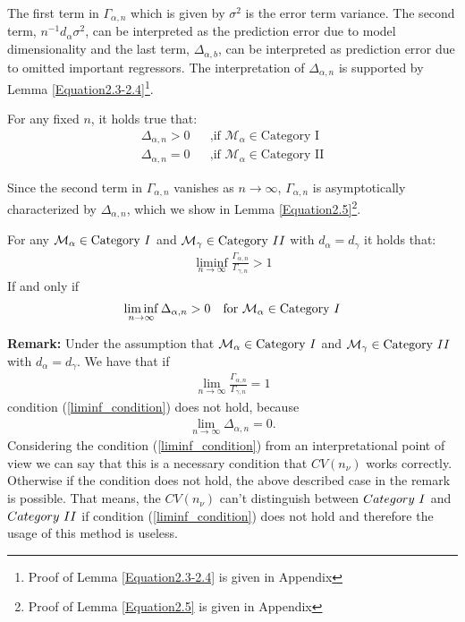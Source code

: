 \documentclass[Research_Module_ES.tex]{subfiles}
\begin{document}
 The first term in $\Gamma_{\alpha,n}$ which is given by $\sigma^2$ is the error term variance. The second term, $n^{-1}d_\alpha\sigma^2$, can be interpreted as the prediction error due to model dimensionality and the last term, $\Delta_{\alpha,b}$, can be interpreted as prediction error due to omitted important regressors. The interpretation of $\Delta_{\alpha,n}$ is supported by Lemma \ref{Equation2.3-2.4}\footnote{Proof of Lemma \ref{Equation2.3-2.4} is given in Appendix }.
\begin{lemma}
	\label{Equation2.3-2.4}
	For any fixed $n$, it holds true that:
	\begin{align*}
		&&\Delta_{\alpha,n}>0 &&\text{,if } \mathcal{M}_\alpha\in\text{Category I}&&\\
		&&\Delta_{\alpha,n}=0 &&\text{,if } \mathcal{M}_\alpha\in\text{Category II}&&
	\end{align*}
\end{lemma}
Since the second term in $\Gamma_{\alpha,n}$ vanishes as $n\to\infty$, $\Gamma_{\alpha,n}$ is asymptotically characterized by $\Delta_{\alpha,n}$, which we show in Lemma \ref{Equation2.5}\footnote{Proof of Lemma \ref{Equation2.5} is given in Appendix }. 
\begin{lemma}
	\label{Equation2.5}
	For any $\mathcal{M}_\alpha\in\text{Category}~\RM{1}$ and $\mathcal{M}_\gamma\in\text{Category}~\RM{2}$ with $d_\alpha=d_\gamma$ it holds that:
	\begin{align*}
	\liminf_{n\rightarrow\infty}\frac{\Gamma_{\alpha,n}}{\Gamma_{\gamma,n}}>1
	\end{align*}
	If and only if
	\begin{align}
	\liminf_{n\rightarrow\infty}\Delta_{\alpha,n}>0 \text{~~~for~}\mathcal{M}_\alpha\in\text{Category}~\RM{1} \label{liminf_condition}
	\end{align}
\end{lemma}

\textbf{Remark:}
	Under the assumption that $\mathcal{M}_\alpha\in\text{Category}~\RM{1}$ and $\mathcal{M}_\gamma\in\text{Category}~\RM{2}$ with $d_\alpha=d_\gamma$. We have that if
	\begin{align*}
		\lim_{n\rightarrow\infty}\frac{\Gamma_{\alpha,n}}{\Gamma_{\gamma,n}}=1
	\end{align*} 
	condition (\ref{liminf_condition}) does not hold, because
	\begin{align*}
	\lim_{n\rightarrow\infty}\Delta_{\alpha,n}=0.
	\end{align*}
Considering the condition (\ref{liminf_condition}) from an interpretational point of view we can say that
this is a necessary condition that $CV(n_\nu)$ works correctly. Otherwise if the condition does not hold, the above described case in the remark is possible. That means, the $CV(n_\nu)$ can't distinguish between $Category~\RM{1}$ and $Category~\RM{2}$ if condition (\ref{liminf_condition}) does not hold and therefore the usage of this method is useless.
\end{document}
